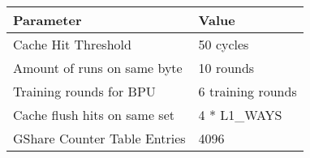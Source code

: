 \documentclass{standalone}
\begin{document}
\centering
\begin{tabular}{@{} *2l @{}} \toprule
    Parameter                    & Value \\ \midrule
    Cache Hit Threshold          & 50 cycles \\
    Amount of runs on same byte  & 10 rounds \\
    Training rounds for BPU      & 6 training rounds \\
    Cache flush hits on same set & 4 * L1\_WAYS \\
    GShare Counter Table Entries & 4096 \\ \bottomrule
\end{tabular}
\end{document}
